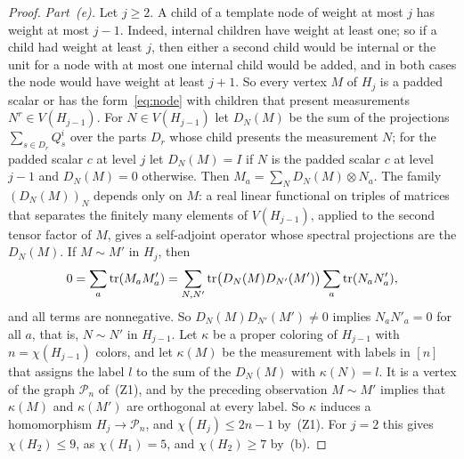 \begin{proof}
\emph{Part~\textup{(e)}.} Let $j\ge2$. A child of a template node of weight at most $j$ has weight at most $j-1$. Indeed, internal children have weight at least one; so if a child had weight at least $j$, then either a second child would be internal or the unit for a node with at most one internal child would be added, and in both cases the node would have weight at least $j+1$. So every vertex $M$ of $H_j$ is a padded scalar or has the form~\eqref{eq:node} with children that present measurements $N^r\in V(H_{j-1})$. For $N\in V(H_{j-1})$ let $D_N(M)$ be the sum of the projections $\sum_{s\in D_r}Q^i_s$ over the parts $D_r$ whose child presents the measurement $N$; for the padded scalar $c$ at level $j$ let $D_N(M)=I$ if $N$ is the padded scalar $c$ at level $j-1$ and $D_N(M)=0$ otherwise. Then $M_a=\sum_ND_N(M)\otimes N_a$. The family $(D_N(M))_N$ depends only on $M$: a real linear functional on triples of matrices that separates the finitely many elements of $V(H_{j-1})$, applied to the second tensor factor of $M$, gives a self-adjoint operator whose spectral projections are the $D_N(M)$. If $M\sim M'$ in $H_j$, then
\[
 0=\sum_a\operatorname{tr}(M_aM'_a)=\sum_{N,N'}\operatorname{tr}\bigl(D_N(M)D_{N'}(M')\bigr)\sum_a\operatorname{tr}(N_aN'_a),
\]
and all terms are nonnegative. So $D_N(M)D_{N'}(M')\ne0$ implies $N_aN'_a=0$ for all $a$, that is, $N\sim N'$ in $H_{j-1}$. Let $\kappa$ be a proper coloring of $H_{j-1}$ with $n=\chi(H_{j-1})$ colors, and let $\kappa(M)$ be the measurement with labels in $[n]$ that assigns the label $l$ to the sum of the $D_N(M)$ with $\kappa(N)=l$. It is a vertex of the graph $\mathcal P_n$ of~(Z1), and by the preceding observation $M\sim M'$ implies that $\kappa(M)$ and $\kappa(M')$ are orthogonal at every label. So $\kappa$ induces a homomorphism $H_j\to\mathcal P_n$, and $\chi(H_j)\le2n-1$ by~(Z1). For $j=2$ this gives $\chi(H_2)\le9$, as $\chi(H_1)=5$, and $\chi(H_2)\ge7$ by~(b).


\end{proof}
